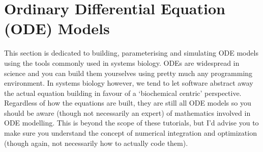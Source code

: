 \documentclass[../main]{subfiles}
\begin{document}
    \section{Ordinary Differential Equation (ODE) Models}
    This section is dedicated to building, parameterising and simulating ODE models using the tools
    commonly used in systems biology. ODEs are widespread in science and you can build them yourselves
    using pretty much any programming environment. In systems biology however, we tend to let
    software abstract away the actual equation building in favour of a `biochemical centric' perspective. Regardless
    of how the equations are built, they are still all ODE models so you should be aware (though not necessarily an
    expert) of mathematics involved in ODE modelling. This is beyond the scope of these tutorials, but I'd advise you
    to make sure you understand the concept of numerical integration and optimization (though again, not necessarily how
    to actually code them).

    
    
\end{document}
